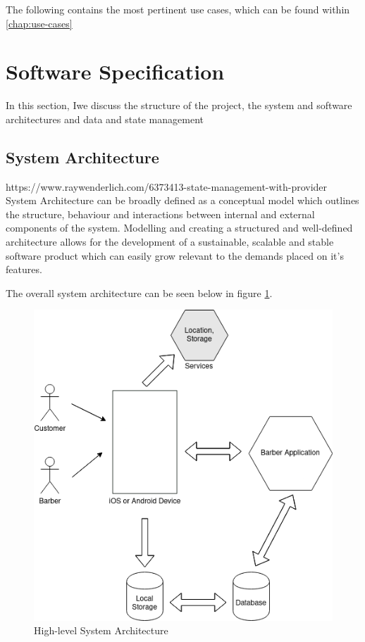 \documentclass[12pt]{article}
\begin{document}
	The following contains the most pertinent use cases, which can be found within \autoref{chap:use-cases}
	


	
	\section{Software Specification}
	In this section, Iwe discuss the structure of the project, the system and software architectures and data and state management
	
	\subsection{System Architecture}
	https://www.raywenderlich.com/6373413-state-management-with-provider
	System Architecture can be broadly defined as a conceptual model which outlines the structure, behaviour and interactions between internal and external components of the system. Modelling and creating a structured and well-defined architecture allows for the development of a sustainable, scalable and stable software product which can easily grow relevant to the demands placed on it's features.
	
	The overall system architecture can be seen below in figure \ref{fig:system-architecture}.
	
	\begin{figure}[H]
		\centering
		\includegraphics[scale=0.7]{images/system-architecture.png}
		\caption{High-level System Architecture}
		\label{fig:system-architecture}
	\end{figure}
	
\end{document}
